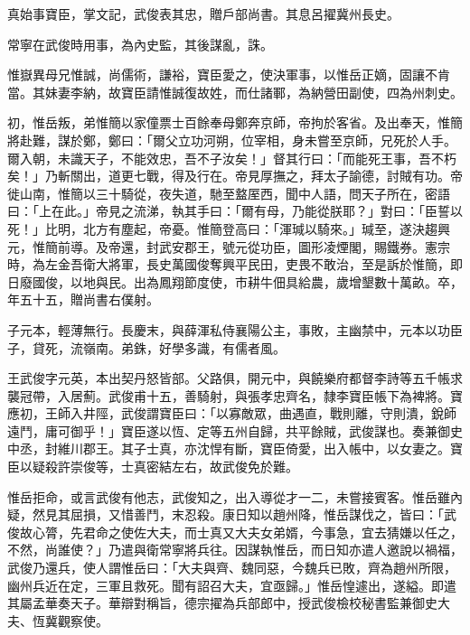 \begin{pinyinscope}
 真始事寶臣，掌文記，武俊表其忠，贈戶部尚書。其息呂擢冀州長史。



 常寧在武俊時用事，為內史監，其後謀亂，誅。



 惟嶽異母兄惟誠，尚儒術，謙裕，寶臣愛之，使決軍事，以惟岳正嫡，固讓不肯當。其妹妻李納，故寶臣請惟誠復故姓，而仕諸鄆，為納營田副使，四為州刺史。



 初，惟岳叛，弟惟簡以家僮票士百餘奉母鄭奔京師，帝拘於客省。及出奉天，惟簡將赴難，謀於鄭，鄭曰：「爾父立功河朔，位宰相，身未嘗至京師，兄死於人手。爾入朝，未識天子，不能效忠，吾不子汝矣！」督其行曰：「而能死王事，吾不朽矣！」乃斬關出，道更七戰，得及行在。帝見厚撫之，拜太子諭德，討賊有功。帝徙山南，惟簡以三十騎從，夜失道，馳至盩厔西，聞中人語，問天子所在，密語曰：「上在此。」帝見之流涕，執其手曰：「爾有母，乃能從朕耶？」對曰：「臣誓以死！」比明，北方有塵起，帝憂。惟簡登高曰：「渾瑊以騎來。」瑊至，遂決趨興元，惟簡前導。及帝還，封武安郡王，號元從功臣，圖形凌煙閣，賜鐵券。憲宗時，為左金吾衛大將軍，長史萬國俊奪興平民田，吏畏不敢治，至是訴於惟簡，即日廢國俊，以地與民。出為鳳翔節度使，市耕牛佃具給農，歲增墾數十萬畝。卒，年五十五，贈尚書右僕射。



 子元本，輕薄無行。長慶末，與薛渾私侍襄陽公主，事敗，主幽禁中，元本以功臣子，貸死，流嶺南。弟銖，好學多識，有儒者風。



 王武俊字元英，本出契丹怒皆部。父路俱，開元中，與饒樂府都督李詩等五千帳求襲冠帶，入居薊。武俊甫十五，善騎射，與張孝忠齊名，隸李寶臣帳下為裨將。寶應初，王師入井陘，武俊謂寶臣曰：「以寡敵眾，曲遇直，戰則離，守則潰，銳師遠鬥，庸可御乎！」寶臣遂以恆、定等五州自歸，共平餘賊，武俊謀也。奏兼御史中丞，封維川郡王。其子士真，亦沈悍有斷，寶臣倚愛，出入帳中，以女妻之。寶臣以疑殺許崇俊等，士真密結左右，故武俊免於難。



 惟岳拒命，或言武俊有他志，武俊知之，出入導從才一二，未嘗接賓客。惟岳雖內疑，然見其屈損，又惜善鬥，末忍殺。康日知以趙州降，惟岳謀伐之，皆曰：「武俊故心膂，先君命之使佐大夫，而士真又大夫女弟婿，今事急，宜去猜嫌以任之，不然，尚誰使？」乃遣與衛常寧將兵往。因謀執惟岳，而日知亦遣人邀說以禍福，武俊乃還兵，使人謂惟岳曰：「大夫與齊、魏同惡，今魏兵已敗，齊為趙州所限，幽州兵近在定，三軍且救死。聞有詔召大夫，宜亟歸。」惟岳惶遽出，遂縊。即遣其屬孟華奏天子。華辯對稱旨，德宗擢為兵部郎中，授武俊檢校秘書監兼御史大夫、恆冀觀察使。




\end{pinyinscope}

